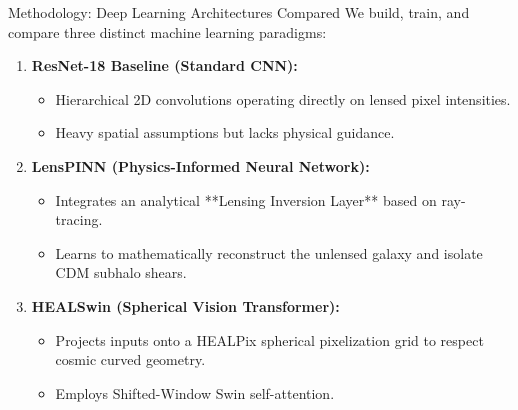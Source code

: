 \documentclass[10pt]{beamer}
\begin{document}
\begin{frame}{Methodology: Deep Learning Architectures Compared}
    We build, train, and compare three distinct machine learning paradigms:
    \vspace{0.3cm}
    \begin{enumerate}
        \item \textbf{ResNet-18 Baseline (Standard CNN):}
            \begin{itemize}
                \item Hierarchical 2D convolutions operating directly on lensed pixel intensities.
                \item Heavy spatial assumptions but lacks physical guidance.
            \end{itemize}
        \item \textbf{LensPINN (Physics-Informed Neural Network):}
            \begin{itemize}
                \item Integrates an analytical **Lensing Inversion Layer** based on ray-tracing.
                \item Learns to mathematically reconstruct the unlensed galaxy and isolate CDM subhalo shears.
            \end{itemize}
        \item \textbf{HEALSwin (Spherical Vision Transformer):}
            \begin{itemize}
                \item Projects inputs onto a HEALPix spherical pixelization grid to respect cosmic curved geometry.
                \item Employs Shifted-Window Swin self-attention.
            \end{itemize}
    \end{enumerate}
\end{frame}
\end{document}
